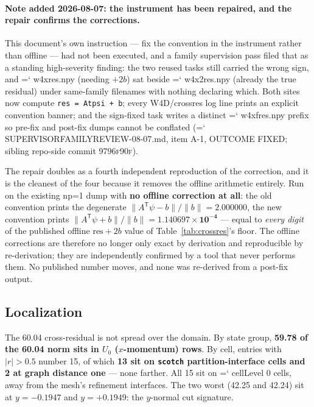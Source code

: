 \documentclass[11pt,a4paper]{article}
\newcommand{\artifact}[1]{{\small\ttfamily\hyphenchar\font=`\-\relax
  \def\_{\textunderscore\allowbreak}#1}}
\newcommand{\commit}[1]{\textsc{\small #1}}
\begin{document}
\paragraph{Note added 2026-08-07: the instrument has been repaired, and the repair confirms
the corrections.} This document's own instruction --- fix the convention in the instrument
rather than offline --- had not been executed, and a family supervision pass filed that as a
standing high-severity finding: the two reused tasks still carried the wrong sign, and
\artifact{w4x\_res\_*.npy} (needing \(+2b\)) sat beside \artifact{w4x2\_res\_*.npy} (already
the true residual) under same-family filenames with nothing declaring which. Both sites now
compute \texttt{res = Atpsi + b}; every W4D/crossres log line prints an explicit convention
banner; and the sign-fixed task writes a distinct \artifact{w4xf\_res\_*.npy} prefix so
pre-fix and post-fix dumps cannot be conflated
(\artifact{SUPERVISOR\_FAMILY\_REVIEW\_2026-08-07.md}, item A-1, OUTCOME FIXED; sibling
repo-side commit \commit{9796f90f}).

The repair doubles as a fourth independent reproduction of the correction, and it is the
cleanest of the four because it removes the offline arithmetic entirely. Run on the existing
np=1 dump with \textbf{no offline correction at all}: the old convention prints the
degenerate \(\lVert A^{\mathsf T}\psi - b\rVert/\lVert b\rVert = 2.000000\), the new
convention prints \(\lVert A^{\mathsf T}\psi + b\rVert/\lVert b\rVert =
\mathbf{1.140697\times10^{-4}}\) --- equal to \emph{every digit} of the published offline
\(\mathrm{res}+2b\) value of Table~\ref{tab:crossres}'s floor. The offline corrections are
therefore no longer only exact by derivation and reproducible by re-derivation; they are
independently confirmed by a tool that never performs them. No published number moves, and
none was re-derived from a post-fix output.

\subsection{Localization}

The 60.04 cross-residual is not spread over the domain. By state group, \textbf{59.78 of the
60.04 norm sits in \(U_0\) (\(x\)-momentum) rows}. By cell, entries with \(\lvert r\rvert >
0.5\) number 15, of which \textbf{13 sit on \texttt{scotch} partition-interface cells and 2 at
graph distance one} --- none farther. All 15 sit on \artifact{cellLevel} 0 cells, away from the
mesh's refinement interfaces. The two worst (42.25 and 42.24) sit at \(y = -0.1947\) and
\(y = +0.1949\): the \(y\)-normal cut signature.
\end{document}
